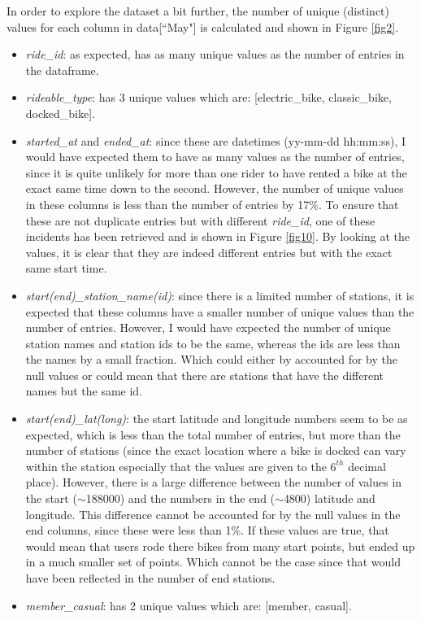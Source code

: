 \documentclass[12pt]{article}
\begin{document}
\begin{itemize}
In order to explore the dataset a bit further, the number of unique (distinct) values for each column in data[``May"] is calculated and shown in Figure \ref{fig2}. 
\begin{itemize}
	\item \textit{ride\_id}: as expected, has as many unique values as the number of entries in the dataframe.
	\item \textit{rideable\_type}: has 3 unique values which are:  [electric\_bike, classic\_bike, docked\_bike].
	\item \textit{started\_at} and \textit{ended\_at}: since these are datetimes (yy-mm-dd hh:mm:ss), I would have expected them to have as many values as the number of entries, since it is quite unlikely for more than one rider to have rented a bike at the exact same time down to the second. However, the number of unique values in these columns is less than the number of entries by 17\%. To ensure that these are not duplicate entries but with different \textit{ride\_id}, one of these incidents has been retrieved and is shown in Figure \ref{fig10}. By looking at the values, it is clear that they are indeed different entries but with the exact same start time.
	\item \textit{start(end)\_station\_name(id)}: since there is a limited number of stations, it is expected that these columns have a smaller number of unique values than the number of entries. However, I would have expected the number of unique station names and station ids to be the same, whereas the ids are less than the names by a small fraction. Which could either by accounted for by the null values or could mean that there are stations that have the different names but the same id.
	\item \textit{start(end)\_lat(long)}: the start latitude and longitude numbers seem to be as expected, which is less than the total number of entries, but more than the number of stations (since the exact location where a bike is docked can vary within the station especially that the values are given to the $6^{th}$ decimal place). However, there is a large difference between the number of values in the start ($\sim$188000) and the numbers in the end ($\sim$4800) latitude and longitude. This difference cannot be accounted for by the null values in the end columns, since these were less than 1\%. If these values are true, that would mean that users rode there bikes from many start points, but ended up in a much smaller set of points. Which cannot be the case since that would have been reflected in the number of end stations. 
	\item \textit{member\_casual}: has 2 unique values which are: [member, casual].
\end{itemize}
	

\end{itemize}
\end{document}
